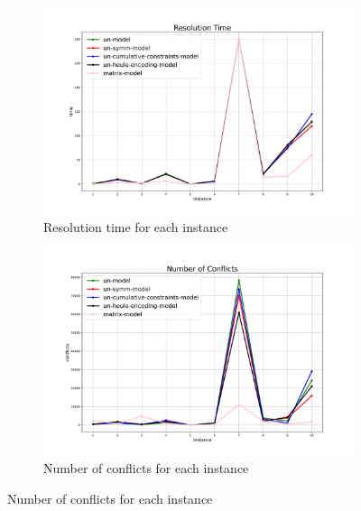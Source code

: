 \begin{figure}[H]
    \centering
    \begin{subfigure}{0.49\linewidth}
        \centering
        \includegraphics[width=\linewidth]{sat_images/time.pdf}
        \caption{Resolution time for each instance}
    \end{subfigure}
    \hfill
    \centering
    \begin{subfigure}{0.49\linewidth}
        \centering
        \includegraphics[width=\linewidth]{sat_images/conflicts.pdf}
        \caption{Number of conflicts for each instance}
    \end{subfigure}

\end{figure}
